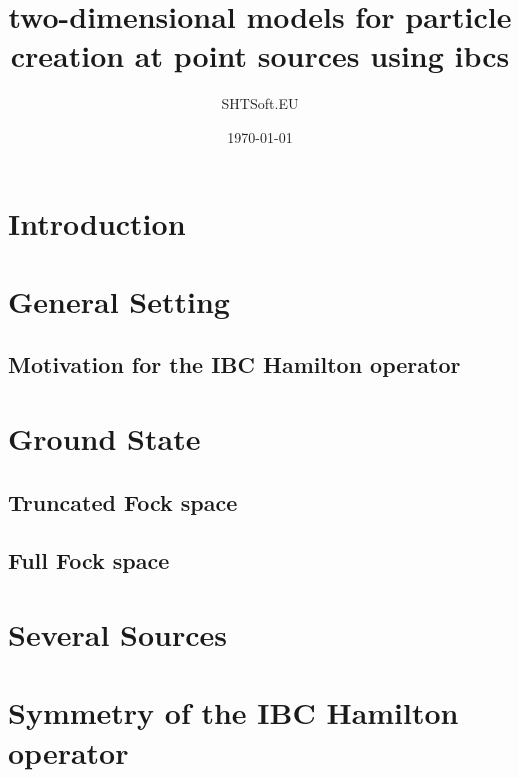 \documentclass[a4paper,11pt,psamsfonts,reqno]{amsart}
\newcounter{prpcounter}
\theoremstyle{proposition}
\theoremstyle{proof}
\begin{document}
\title{two-dimensional models for particle creation at point sources using ibcs}
\author{SHTSoft.EU}
\date{\today}
\maketitle
\tableofcontents

\setcounter{prpcounter}{0}





\section{Introduction}
\label{sec:intro}



\section{General Setting}
\label{sec:genset}


\subsection*{Motivation for the IBC Hamilton operator}
\label{subsec:motibc}



\section{Ground State}
\label{sec:grstate}


\subsection{Truncated Fock space}
\label{subsec:grtrfsp}


\subsection{Full Fock space}
\label{subsec:grffsp}



\section{Several Sources}
\label{sec:sevsources}



\section{Symmetry of the IBC Hamilton operator}
\label{sec:symmetry}



\nocite{wiki-pedia0en}



\end{document}
